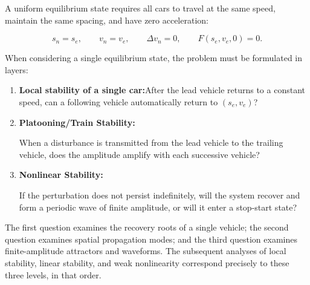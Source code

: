 \documentclass[11pt,a4paper,openany]{book}
\numberwithin{equation}{chapter}
\numberwithin{figure}{chapter}
\numberwithin{table}{chapter}
\begin{document}
A uniform equilibrium state requires all cars to travel at the same speed, maintain the same spacing, and have zero acceleration:

\begin{equation}
s_n=s_e,\qquad v_n=v_e,\qquad \Delta v_n=0,\qquad
F(s_e,v_e,0)=0.
\end{equation}

When considering a single equilibrium state, the problem must be formulated in layers:







\begin{enumerate}[leftmargin=1.6em,itemsep=3pt]
\item \textbf{Local stability of a single car:}After the lead vehicle returns to a constant speed, can a following vehicle automatically return to $(s_e,v_e)$?







\item \textbf{Platooning/Train Stability:}




When a disturbance is transmitted from the lead vehicle to the trailing vehicle, does the amplitude amplify with each successive vehicle?







\item \textbf{Nonlinear Stability:}




If the perturbation does not persist indefinitely, will the system recover and form a periodic wave of finite amplitude, or will it enter a stop-start state?







\end{enumerate}







The first question examines the recovery roots of a single vehicle; the second question examines spatial propagation modes; and the third question examines finite-amplitude attractors and waveforms. The subsequent analyses of local stability, linear stability, and weak nonlinearity correspond precisely to these three levels, in that order.
\end{document}
